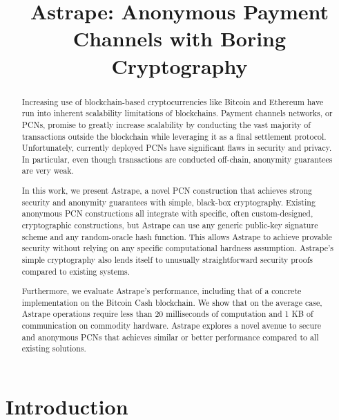 \documentclass[USenglish,oneside,twocolumn]{article}
\begin{document}
\title{Astrape: Anonymous Payment Channels with Boring Cryptography}
\maketitle

\begin{abstract}
    Increasing use of blockchain-based cryptocurrencies like Bitcoin and Ethereum have run into inherent scalability limitations of blockchains. Payment channels networks, or PCNs, promise to greatly increase scalability by conducting the vast majority of transactions outside the blockchain while leveraging it as a final settlement protocol. Unfortunately, currently deployed PCNs have significant flaws in security and privacy. In particular, even though transactions are conducted off-chain, anonymity guarantees are very weak.

    In this work, we present Astrape, a novel PCN construction that achieves strong security and anonymity guarantees with simple, black-box cryptography. Existing anonymous PCN constructions all integrate with specific, often custom-designed, cryptographic constructions, but Astrape can use any generic public-key signature scheme and any random-oracle hash function. This allows Astrape to achieve provable security without relying on any specific computational hardness assumption. Astrape's simple cryptography also lends itself to unusually straightforward security proofs compared to existing systems.

    Furthermore, we evaluate Astrape's performance, including that of a concrete implementation on the Bitcoin Cash blockchain. We show that on the average case, Astrape operations require less than 20 milliseconds of computation and 1 KB of communication on commodity hardware. Astrape explores a novel avenue to secure and anonymous PCNs that achieves similar or better performance compared to all existing solutions.
\end{abstract}

\section{Introduction}
\end{document}
